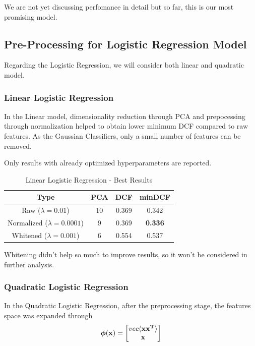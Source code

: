 \documentclass[12pt, twocolumn]{article}
\begin{document}
We are not yet discussing perfomance in detail but so far, this is our most promising model.

\subsection{Pre-Processing for Logistic Regression Model}

Regarding the Logistic Regression, we will consider both linear and quadratic model.

\subsubsection{Linear Logistic Regression}

In the Linear model, dimensionality reduction through PCA and prepocessing through normalization
helped to obtain lower minimum DCF compared to raw features. As the Gaussian Classifiers, only a small number
of features can be removed.

Only results with already optimized hyperparameters are reported.
\begin{table}[H]
    \centering
        \begin{tabular}{||c|c|c|c||}
            \hline
            Type & PCA & DCF & minDCF \\
            \hline
            \hline
            Raw ($\lambda = 0.01$) & 10 & 0.369 &  0.342  \\
            Normalized ($\lambda = 0.0001$) & 9 & 0.369 &  {\bf 0.336}  \\
            Whitened ($\lambda = 0.001$) & 6 & 0.554 &  0.537  \\
            \hline
    \end{tabular}
    \caption{Linear Logistic Regression - Best Results}
\end{table}

Whitening didn't help so much to improve results, so it won't be considered in further analysis.
\subsubsection{Quadratic Logistic Regression}

In the Quadratic Logistic Regression, after the preprocessing stage, the features space
was expanded through 
$$ {\bf \boldsymbol{\phi}(x)} = {
    \begin{bmatrix}
    vec\langle{\bf xx^T}\rangle\\
    {\bf x}
    \end{bmatrix}}
$$ 
\end{document}

